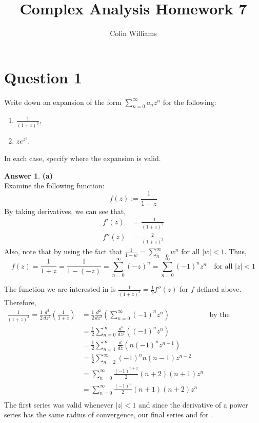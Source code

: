 \documentclass[10pt,a4paper]{article}
\title{Complex Analysis Homework 7}
\author{Colin Williams}
\theoremstyle{definition}
\newtheorem*{answer*}{Answer}
\begin{document}
\maketitle

\section*{Question 1}
Write down an expansion of the form $\displaystyle \sum_{n = 0}^{\infty} a_nz^n$ for the following:
\begin{enumerate}[label = (\alph*)]
\item $\displaystyle \frac{1}{(1 + z)^3}$,
\item $\displaystyle ze^{z^2}$.
\end{enumerate}
In each case, specify where the expansion is valid. 

\begin{answer*}{\textbf{(a)}}
\\Examine the following function:
\[f(z) := \frac{1}{1 + z}\]
By taking derivatives, we can see that,
\begin{align*}
f'(z) &= \frac{-1}{(1 + z)^2}\\
f''(z) &= \frac{2}{(1 + z)^3}
\end{align*}
Also, note that by using the fact that $\displaystyle \frac{1}{1 - w} = \sum_{n = 0}^{\infty} w^n$ for all $|w| < 1$. Thus,
\[f(z) = \frac{1}{1 + z} = \frac{1}{1 - (-z)} = \sum_{n =0}^{\infty} (-z)^n = \sum_{n = 0}^{\infty}(-1)^n z^n \quad \text{for all $|z| < 1$}\]

The function we are interested in is $\displaystyle \frac{1}{(1 + z)^3} = \frac{1}{2}f''(z)$ for $f$ defined above. Therefore,
\begin{align*}
\frac{1}{(1 + z)^3} = \frac{1}{2} \frac{d^2}{dz^2} \left(\frac{1}{1 + z}\right) &= \frac{1}{2} \frac{d^2}{dz^2} \left(\sum_{n = 0}^{\infty} (-1)^n z^n\right) &\text{by the examination above}\\
&= \frac{1}{2} \sum_{n = 0}^{\infty} \frac{d^2}{dz^2}\left((-1)^n z^n\right)\\
&= \frac{1}{2}\sum_{n = 1}^{\infty} \frac{d}{dz}\left(n(-1)^nz^{n - 1}\right)\\
&= \frac{1}{2} \sum_{n = 2}^{\infty} (-1)^n n(n - 1)z^{n-2}\\
&= \sum_{n = 0}^{\infty} \frac{(-1)^{n + 2}}{2}(n + 2)(n + 1)z^n\\
&= \sum_{n = 0}^{\infty} \frac{(-1)^{n}}{2}(n + 1)(n + 2)z^n\\
\end{align*}
The first series was valid whenever $|z| < 1$ and since the derivative of a power series has the same radius of convergence, our final series  and for .
\end{answer*}
\end{document}
